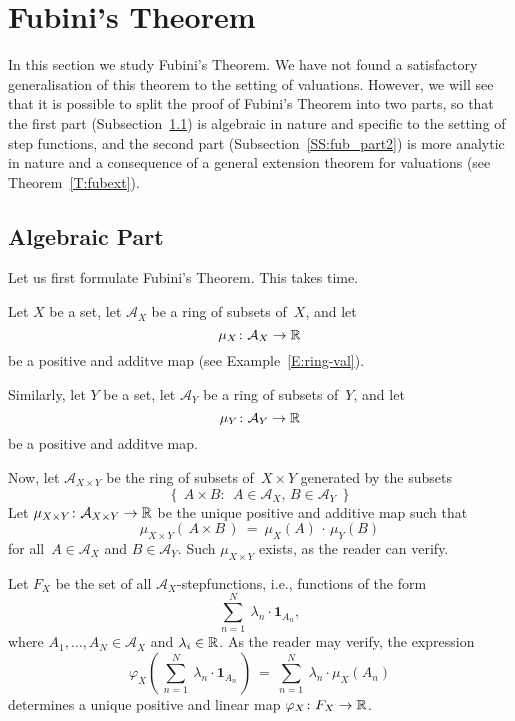 \documentclass[main.tex]{subfiles}
\begin{document}
\section{Fubini's Theorem}
\label{S:fub}
\noindent
In this section we study Fubini's Theorem.
We have not found a satisfactory generalisation of this theorem
to the setting of valuations.
However,
we will see that it is possible to split
the proof of Fubini's Theorem
into two parts,
so that the first part (Subsection~\ref{SS:fub_part1})
is algebraic in nature
and specific to the setting of step functions,
and the second part (Subsection~\ref{SS:fub_part2}) is more analytic in nature
and a consequence of a
general extension theorem for valuations (see Theorem~\ref{T:fubext}).

\subsection{Algebraic Part}
\label{SS:fub_part1}
Let us first formulate Fubini's Theorem.
This takes time.

Let $X$ be a set,
let $\mathcal{A}_X$ be a ring of subsets of~$X$,
and let 
\begin{equation*}
\mu_X\colon \mathcal{A}_X \rightarrow \mathbb{R}
\end{equation*}
be a positive and additve map
(see Example~\ref{E:ring-val}).

Similarly, let $Y$ be a set,
let $\mathcal{A}_Y$ be a ring of subsets of~$Y$,
and let 
\begin{equation*}
\mu_Y\colon \mathcal{A}_Y \rightarrow \mathbb{R}
\end{equation*}
be a positive and additve map.

Now, let $\mathcal{A}_{X\times Y}$
be the ring of subsets of~$X\times Y$
generated by the subsets
\begin{equation*}
\{\ \  A \times B\colon\ \  \text{$A\in \mathcal{A}_X$, \ \ 
 $B\in\mathcal{A}_Y$} \ \ \}
\end{equation*}
Let $\mu_{X\times Y} \colon \mathcal{A}_{X\times Y} \rightarrow \mathbb{R}$
be the unique positive and additive map such that
\begin{equation*}
\mu_{X\times Y} (\,A\times B\,)
\ =\ \mu_X(A)\,\cdot\,\mu_Y(B)
\end{equation*}
for all~$A\in\mathcal{A}_X$ and $B\in\mathcal{A}_Y$.
Such $\mu_{X\times Y}$ exists,
as the reader can verify.

Let $F_X$ be the set of all $\mathcal{A}_X$-stepfunctions,
i.e., functions of the form
\begin{equation*}
\textstyle{\sum_{n=1}^N \ \lambda_n \cdot \mathbf{1}_{A_n}  },
\end{equation*}
where $A_1,\dotsc,A_N \in\mathcal{A}_X$
and $\lambda_i \in \mathbb{R}$.
As the reader may verify,
the expression
\begin{equation*}
\varphi_X(\,\textstyle{\sum_{n=1}^N \ \lambda_n \cdot \mathbf{1}_{A_n}}\,)
\ =\ \textstyle{\sum_{n=1}^N \ \lambda_n \cdot \mu_X (A_n)}
\end{equation*}
determines a unique positive and linear
map $\varphi_X\colon F_X \rightarrow \mathbb{R}$. 
\end{document}
